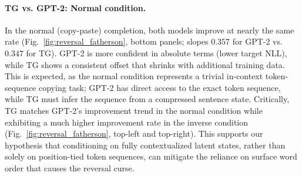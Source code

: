 \documentclass{article}
\begin{document}
\paragraph{TG vs. GPT-2: Normal condition.}
In the normal (copy-paste) completion, both models improve at nearly the same rate (Fig.~\ref{fig:reversal_fatherson}, bottom panels; slopes $0.357$ for GPT-2 vs.\ $0.347$ for TG).
GPT-2 is more confident in absolute terms (lower target NLL), while TG shows a consistent offset that shrinks with additional training data.
This is expected, as the normal condition represents a trivial in-context token-sequence copying task; GPT-2 has direct access to the exact token sequence, while TG must infer the sequence from a compressed sentence state.
Critically, TG matches GPT-2’s improvement trend in the normal condition while exhibiting a much higher improvement rate in the inverse condition (Fig.~\ref{fig:reversal_fatherson}, top-left and top-right).
This supports our hypothesis that conditioning on fully contextualized latent states, rather than solely on position-tied token sequences, can mitigate the reliance on surface word order that causes the reversal curse.
\end{document}
